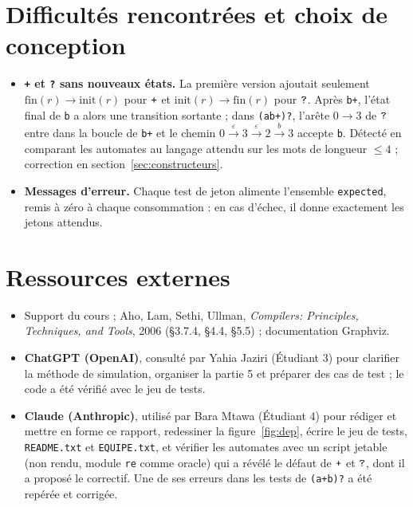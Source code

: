 \documentclass[12pt,a4paper]{article}
\newcommand{\code}[1]{{\fontsize{10}{12}\selectfont\texttt{#1}}}
\newcommand{\tok}[1]{\ensuremath{\text{\fontsize{10}{12}\selectfont\ttfamily #1}}}
\begin{document}
\section{Difficultés rencontrées et choix de conception}\label{sec:difficultes}

\begin{itemize}
\item \textbf{\texttt{+} et \texttt{?} sans nouveaux états.} La première version ajoutait
  seulement $\mathrm{fin}(r) \to \mathrm{init}(r)$ pour \tok{+} et
  $\mathrm{init}(r) \to \mathrm{fin}(r)$ pour \tok{?}. Après \code{b+}, l'état final de \code{b} a
  alors une transition sortante ; dans \code{(ab+)?}, l'arête $0 \to 3$ de \tok{?} entre dans la
  boucle de \code{b+} et le chemin
  $0 \xrightarrow{\varepsilon} 3 \xrightarrow{\varepsilon} 2 \xrightarrow{b} 3$ accepte
  \code{b}. Détecté en comparant les automates au langage attendu sur les mots de longueur
  $\le 4$ ; correction en section~\ref{sec:constructeurs}.
\item \textbf{Messages d'erreur.} Chaque test de jeton alimente l'ensemble \code{expected}, remis à
  zéro à chaque consommation : en cas d'échec, il donne exactement les jetons attendus.
\end{itemize}

\section{Ressources externes}

\begin{itemize}
\item Support du cours ; Aho, Lam, Sethi, Ullman, \emph{Compilers: Principles, Techniques, and
  Tools}, 2006 (§3.7.4, §4.4, §5.5) ; documentation Graphviz.
\item \textbf{ChatGPT (OpenAI)}, consulté par Yahia Jaziri (Étudiant 3) pour clarifier la méthode
  de simulation, organiser la partie 5 et préparer des cas de test ; le code a été
  vérifié avec le jeu de tests.
\item \textbf{Claude (Anthropic)}, utilisé par Bara Mtawa (Étudiant 4) pour rédiger et mettre en
  forme ce rapport, redessiner la figure~\ref{fig:dep}, écrire le jeu de tests, \code{README.txt}
  et \code{EQUIPE.txt}, et vérifier les automates avec un script jetable (non rendu, module
  \code{re} comme oracle) qui a révélé le défaut de \tok{+} et \tok{?}, dont il a proposé le
  correctif. Une de ses erreurs dans les tests de \code{(a+b)?} a été repérée et corrigée.
\end{itemize}
\end{document}
